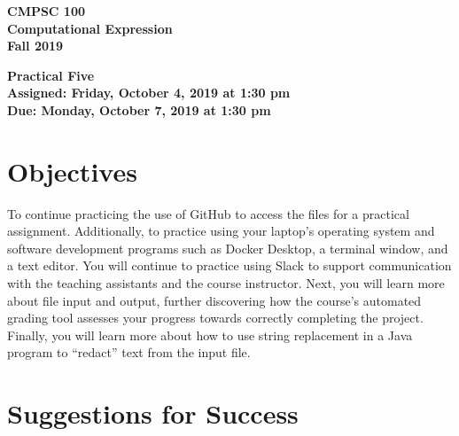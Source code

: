 \documentclass[11pt]{article}
\newcommand{\assignmentduedate}{October 7}
\newcommand{\assignmentassignedate}{October 4}
\newcommand{\assignmentnumber}{Five}
\newcommand{\labyear}{2019}
\newcommand{\labdueday}{Monday}
\newcommand{\labassignday}{Friday}
\newcommand{\labtime}{1:30 pm}
\newcommand{\assigneddate}{Assigned: \labassignday, \assignmentassignedate, \labyear{} at \labtime{}}
\newcommand{\duedate}{Due: \labdueday, \assignmentduedate, \labyear{} at \labtime{}}
\newcommand{\labtitle}[1]
{
  \begin{center}
    \begin{center}
      \bf
      CMPSC 100\\Computational Expression\\
      Fall 2019\\
      \medskip
    \end{center}
    \bf
    #1
  \end{center}
}
\begin{document}
\thispagestyle{empty}

\labtitle{Practical \assignmentnumber{} \\ \assigneddate{} \\ \duedate{}}

\section*{Objectives}

To continue practicing the use of GitHub to access the files for a practical
assignment. Additionally, to practice using your laptop's operating system and
software development programs such as Docker Desktop, a terminal window, and a
text editor. You will continue to practice using Slack to support communication
with the teaching assistants and the course instructor. Next, you will learn
more about file input and output, further discovering how the course's automated
grading tool assesses your progress towards correctly completing the project.
Finally, you will learn more about how to use string replacement in a Java
program to ``redact'' text from the input file.

\section*{Suggestions for Success}
\end{document}
